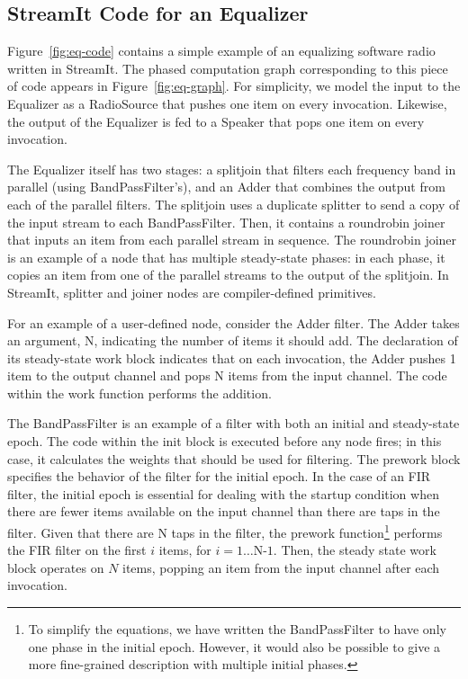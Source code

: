 \subsection{StreamIt Code for an Equalizer}

Figure~\ref{fig:eq-code} contains a simple example of an equalizing
software radio written in StreamIt.  The phased computation graph
corresponding to this piece of code appears in
Figure~\ref{fig:eq-graph}.  For simplicity, we model the input to the
Equalizer as a RadioSource that pushes one item on every invocation.
Likewise, the output of the Equalizer is fed to a Speaker that pops
one item on every invocation.

The Equalizer itself has two stages: a splitjoin that filters each
frequency band in parallel (using BandPassFilter's), and an Adder that
combines the output from each of the parallel filters.  The splitjoin
uses a duplicate splitter to send a copy of the input stream to each
BandPassFilter.  Then, it contains a roundrobin joiner that inputs an
item from each parallel stream in sequence.  The roundrobin joiner is
an example of a node that has multiple steady-state phases: in each
phase, it copies an item from one of the parallel streams to the
output of the splitjoin.  In StreamIt, splitter and joiner nodes are
compiler-defined primitives.

For an example of a user-defined node, consider the Adder filter.  The
Adder takes an argument, N, indicating the number of items it should
add.  The declaration of its steady-state work block indicates that on
each invocation, the Adder pushes 1 item to the output channel and
pops N items from the input channel.  The code within the work
function performs the addition.

The BandPassFilter is an example of a filter with both an initial and
steady-state epoch.  The code within the init block is executed before
any node fires; in this case, it calculates the weights that should be
used for filtering.  The prework block specifies the behavior of the
filter for the initial epoch.  In the case of an FIR filter, the
initial epoch is essential for dealing with the startup condition when
there are fewer items available on the input channel than there are
taps in the filter.  Given that there are N taps in the filter, the
prework function\footnote{To simplify the equations, we have written
the BandPassFilter to have only one phase in the initial epoch.
However, it would also be possible to give a more fine-grained
description with multiple initial phases.} performs the FIR filter on
the first $i$ items, for $i = 1 \dots \mbox{N-1}$.  Then, the steady
state work block operates on $N$ items, popping an item from the input
channel after each invocation.

